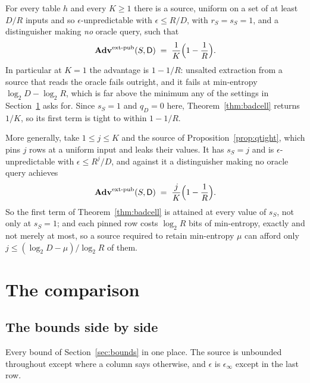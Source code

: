 \documentclass{aicr-solution}
\newcommand{\Adv}{\mathbf{Adv}}
\newcommand{\extp}{\mathrm{ext}\text{-}\mathrm{pub}}
\begin{document}
\begin{proposition}\label{prop:unsalted}
For every table $h$ and every $K \ge 1$ there is a source, uniform on a set of at least $D/R$
inputs and so $\epsilon$-unpredictable with $\epsilon \le R/D$, with $r_S = s_S = 1$, and a
distinguisher making \emph{no} oracle query, such that
\[
  \Adv^{\extp}(S,\mathsf{D}) \;=\; \frac{1}{K}\Bigl(1 - \frac1R\Bigr) .
\]
In particular at $K = 1$ the advantage is $1 - 1/R$: unsalted extraction from a source that reads
the oracle fails outright, and it fails at min-entropy $\log_2 D - \log_2 R$, which is far above the
minimum any of the settings in Section~\ref{sec:compare} asks for. Since $s_S = 1$ and $q_D = 0$
here, Theorem~\ref{thm:badcell} returns $1/K$, so its first term is tight to within $1 - 1/R$.

More generally, take $1 \le j \le K$ and the source of Proposition~\ref{prop:qtight}, which pins $j$
rows at a uniform input and leaks their values. It has $s_S = j$ and is $\epsilon$-unpredictable
with $\epsilon \le R^{j}/D$, and against it a distinguisher making no oracle query achieves
\[
  \Adv^{\extp}(S,\mathsf{D}) \;=\; \frac{j}{K}\Bigl(1 - \frac1R\Bigr) .
\]
So the first term of Theorem~\ref{thm:badcell} is attained at every value of $s_S$, not only at
$s_S = 1$; and each pinned row costs $\log_2 R$ bits of min-entropy, exactly and not merely at
most, so a source required to retain min-entropy $\mu$ can afford only
$j \le (\log_2 D - \mu)/\log_2 R$ of them.
\end{proposition}

\section{The comparison}\label{sec:compare}

\subsection*{The bounds side by side}

Every bound of Section~\ref{sec:bounds} in one place. The source is unbounded throughout except
where a column says otherwise, and $\epsilon$ is $\epsilon_\infty$ except in the last row.
\end{document}
